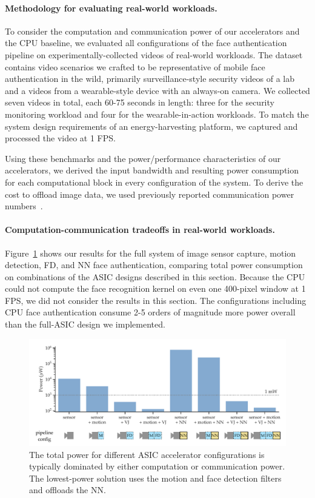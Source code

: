 \paragraph{Methodology for evaluating real-world workloads.} To consider the computation and communication power of our accelerators and the CPU baseline, we evaluated all configurations of the face authentication pipeline on experimentally-collected videos of real-world workloads.
The dataset contains video scenarios we crafted to be representative of mobile face authentication in the wild, primarily surveillance-style security videos of a lab and a videos from a wearable-style device with an always-on camera.
We collected seven videos in total, each 60-75 seconds in length: three for the security monitoring workload and four for the wearable-in-action workloads.
To match the system design requirements of an energy-harvesting platform, we captured and processed the video at 1 FPS.

Using these benchmarks and the power/performance characteristics of our accelerators, we derived the input bandwidth and resulting power consumption for each computational block in every configuration of the system. To derive the cost to offload image data, we used previously reported communication power numbers~\cite{wispcam}.

\paragraph{Computation-communication tradeoffs in real-world workloads.} Figure~\ref{fig:all-face-auth-configs} shows our results for the full system of image sensor capture, motion detection, FD, and NN face authentication, comparing total power consumption on combinations of the ASIC designs described in this section. Because the CPU could not compute the face recognition kernel on even one 400-pixel window at 1 FPS, we did not consider the results in this section. The configurations including CPU face authentication consume 2-5 orders of magnitude more power overall than the full-ASIC design we implemented.


\begin{figure}
\centering
    \begin{center}
      \includegraphics[width=\textwidth]{nsp-figs/FA_compute_comp_v5_2.pdf}
    \end{center}
    \caption{The total power for different ASIC accelerator configurations is typically dominated by either computation or communication power. The lowest-power solution uses the motion and face detection filters and offloads the NN. }
    \label{fig:all-face-auth-configs}
\end{figure}


